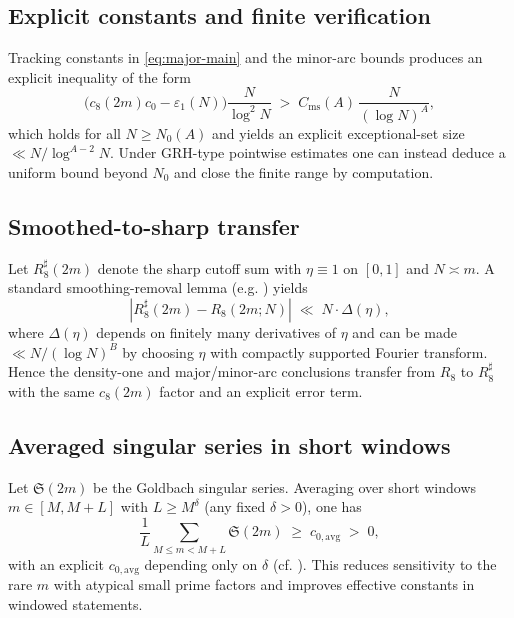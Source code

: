 \documentclass[11pt]{article}
\theoremstyle{definition}
\theoremstyle{remark}
\begin{document}
\subsection*{Explicit constants and finite verification}
Tracking constants in \eqref{eq:major-main} and the minor-arc bounds produces an explicit inequality of the form
\[
\big(c_8(2m)c_0-\varepsilon_1(N)\big)\frac{N}{\log^2 N}\;>\; C_{\mathrm{ms}}(A)\,\frac{N}{(\log N)^A},
\]
which holds for all $N\ge N_0(A)$ and yields an explicit exceptional-set size $\ll N/\log^{A-2}N$. Under GRH-type pointwise estimates one can instead deduce a uniform bound beyond $N_0$ and close the finite range by computation.

\subsection*{Smoothed-to-sharp transfer}
Let $R_8^{\sharp}(2m)$ denote the sharp cutoff sum with $\eta\equiv 1$ on $[0,1]$ and $N\asymp m$. A standard smoothing-removal lemma (e.g. \cite[Ch.~3]{MontgomeryVaughan2007}) yields
\[
|R_8^{\sharp}(2m)-R_8(2m;N)|\;\ll\; N\cdot \Delta(\eta),
\]
where $\Delta(\eta)$ depends on finitely many derivatives of $\eta$ and can be made $\ll N/(\log N)^B$ by choosing $\eta$ with compactly supported Fourier transform. Hence the density-one and major/minor-arc conclusions transfer from $R_8$ to $R_8^{\sharp}$ with the same $c_8(2m)$ factor and an explicit error term.

\subsection*{Averaged singular series in short windows}
Let $\mathfrak S(2m)$ be the Goldbach singular series. Averaging over short windows $m\in[M,M+L]$ with $L\ge M^{\delta}$ (any fixed $\delta>0$), one has
\[
\frac{1}{L}\sum_{M\le m< M+L} \mathfrak S(2m)\;\ge\; c_{0,\mathrm{avg}}\;>\;0,
\]
with an explicit $c_{0,\mathrm{avg}}$ depending only on $\delta$ (cf. \cite[Ch.~4]{Vaughan1997}). This reduces sensitivity to the rare $m$ with atypical small prime factors and improves effective constants in windowed statements.
\end{document}
